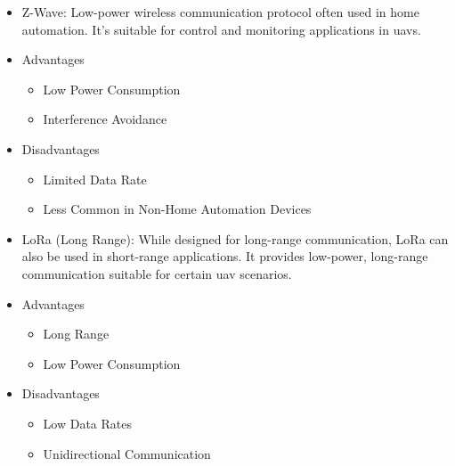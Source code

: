 \begin{itemize}
\item Z-Wave: Low-power wireless communication protocol often used in home automation. It's suitable for control and monitoring applications in \glspl{uav}.
    \item Advantages 
        \begin{itemize}
            \item Low Power Consumption
            \item Interference Avoidance
        \end{itemize}
    \item Disadvantages 
        \begin{itemize}
            \item Limited Data Rate
            \item Less Common in Non-Home Automation Devices
        \end{itemize}
        
\item LoRa (Long Range): While designed for long-range communication, LoRa can also be used in short-range applications. It provides low-power, long-range communication suitable for certain \gls{uav} scenarios.
    \item Advantages 
        \begin{itemize}
            \item Long Range
            \item Low Power Consumption
        \end{itemize}
    \item Disadvantages
        \begin{itemize}
            \item Low Data Rates
            \item Unidirectional Communication
        \end{itemize}
\end{itemize}